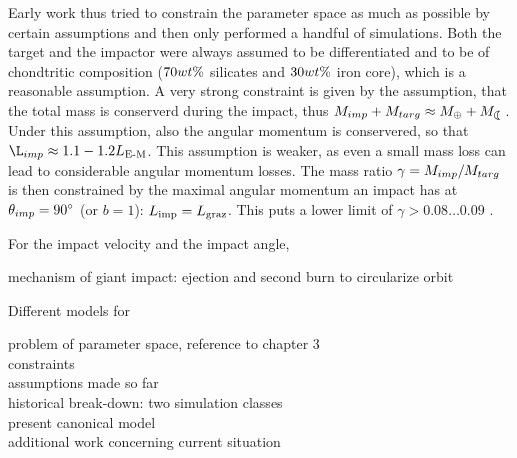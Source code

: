 Early work \citep{Benz:1985p1755, Benz:1989p1893, Cameron:2000p1854} thus tried to constrain the parameter space as much as possible by certain assumptions and then only performed a handful of simulations. Both the target and the impactor were always assumed to be differentiated and to be of chondtritic composition ($70 wt\mathrm{\%}$ silicates and $30 wt\mathrm{\%}$ iron core), which is a reasonable assumption. A very strong constraint is given by the assumption, that the total mass is conserverd during the impact, thus $\Mimp + \Mtar \approx \ME + \ML$. Under this assumption, also the angular momentum is conservered, so that $\L_{imp} \approx 1.1 - 1.2 \lem$. This assumption is weaker, as even a small mass loss can lead to considerable angular momentum losses. The mass ratio $\gamma = M_{imp} / M_{targ}$ is then constrained by the maximal angular momentum an impact has at $\theta_{imp} = 90 ^\circ$ (or $b = 1$): $L_{\textrm{imp}} = L_{\textrm{graz}}$. This puts a lower limit of $\gamma > 0.08 \dots 0.09$ \citep{Canup:2001p1861}.

For the impact velocity and the impact angle, 




mechanism of giant impact: ejection and second burn to circularize orbit


Different models for 

problem of parameter space, reference to chapter 3\\
constraints\\
assumptions made so far\\
historical break-down: two simulation classes\\
present canonical model\\
additional work concerning
current situation\\


